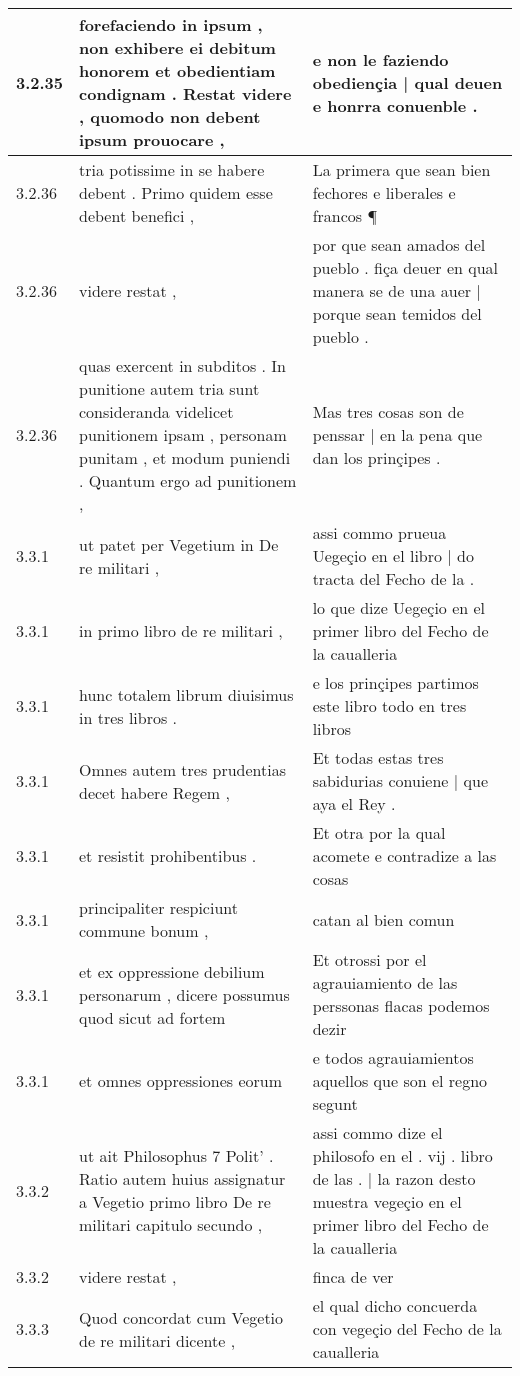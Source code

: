 \begin{tabular}{|p{1cm}|p{6.5cm}|p{6.5cm}|}
3.2.35 & forefaciendo in ipsum , non exhibere ei debitum honorem et obedientiam condignam . Restat videre , quomodo non debent ipsum prouocare , & e non le faziendo obediençia | qual deuen e honrra conuenble . \\\hline
3.2.36 & tria potissime in se habere debent . Primo quidem esse debent benefici , & La primera que sean bien fechores e liberales e francos ¶ \\\hline
3.2.36 & videre restat , & por que sean amados del pueblo . fiça deuer en qual manera se de una auer | porque sean temidos del pueblo . \\\hline
3.2.36 & quas exercent in subditos . In punitione autem tria sunt consideranda videlicet punitionem ipsam , personam punitam , et modum puniendi . Quantum ergo ad punitionem , & Mas tres cosas son de penssar | en la pena que dan los prinçipes . \\\hline
3.3.1 & ut patet per Vegetium in De re militari , & assi commo prueua Uegeçio en el libro | do tracta del Fecho de la . \\\hline
3.3.1 & in primo libro de re militari , & lo que dize Uegeçio en el primer libro del Fecho de la caualleria \\\hline
3.3.1 & hunc totalem librum diuisimus in tres libros . & e los prinçipes partimos este libro todo en tres libros \\\hline
3.3.1 & Omnes autem tres prudentias decet habere Regem , & Et todas estas tres sabidurias conuiene | que aya el Rey . \\\hline
3.3.1 & et resistit prohibentibus . & Et otra por la qual acomete e contradize a las cosas \\\hline
3.3.1 & principaliter respiciunt commune bonum , & catan al bien comun \\\hline
3.3.1 & et ex oppressione debilium personarum , dicere possumus quod sicut ad fortem & Et otrossi por el agrauiamiento de las perssonas flacas podemos dezir \\\hline
3.3.1 & et omnes oppressiones eorum & e todos agrauiamientos aquellos que son el regno segunt \\\hline
3.3.2 & ut ait Philosophus 7 Polit’ . Ratio autem huius assignatur a Vegetio primo libro De re militari capitulo secundo , & assi commo dize el philosofo en el . vij . libro de las . | la razon desto muestra vegeçio en el primer libro del Fecho de la caualleria \\\hline
3.3.2 & videre restat , & finca de ver \\\hline
3.3.3 & Quod concordat cum Vegetio de re militari dicente , & el qual dicho concuerda con vegeçio del Fecho de la caualleria \\\hline

\end{tabular}
